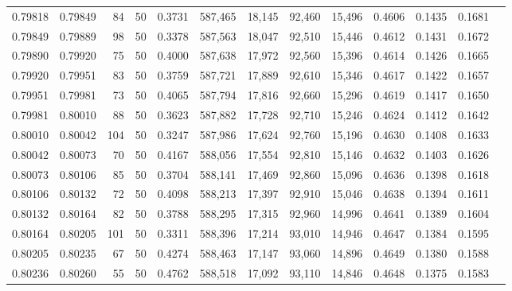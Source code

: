 \begin{tabular}{rrrrrrrrrrrrr}
0.79818 & 0.79849 &    84 &  50 &                                     0.3731 & 587,465 &  18,145 &  92,460 &  15,496 & 0.4606 & 0.1435 & 0.1681 \\
0.79849 & 0.79889 &    98 &  50 &                                     0.3378 & 587,563 &  18,047 &  92,510 &  15,446 & 0.4612 & 0.1431 & 0.1672 \\
0.79890 & 0.79920 &    75 &  50 &                                     0.4000 & 587,638 &  17,972 &  92,560 &  15,396 & 0.4614 & 0.1426 & 0.1665 \\
0.79920 & 0.79951 &    83 &  50 &                                     0.3759 & 587,721 &  17,889 &  92,610 &  15,346 & 0.4617 & 0.1422 & 0.1657 \\
0.79951 & 0.79981 &    73 &  50 &                                     0.4065 & 587,794 &  17,816 &  92,660 &  15,296 & 0.4619 & 0.1417 & 0.1650 \\
0.79981 & 0.80010 &    88 &  50 &                                     0.3623 & 587,882 &  17,728 &  92,710 &  15,246 & 0.4624 & 0.1412 & 0.1642 \\
0.80010 & 0.80042 &   104 &  50 &                                     0.3247 & 587,986 &  17,624 &  92,760 &  15,196 & 0.4630 & 0.1408 & 0.1633 \\
0.80042 & 0.80073 &    70 &  50 &                                     0.4167 & 588,056 &  17,554 &  92,810 &  15,146 & 0.4632 & 0.1403 & 0.1626 \\
0.80073 & 0.80106 &    85 &  50 &                                     0.3704 & 588,141 &  17,469 &  92,860 &  15,096 & 0.4636 & 0.1398 & 0.1618 \\
0.80106 & 0.80132 &    72 &  50 &                                     0.4098 & 588,213 &  17,397 &  92,910 &  15,046 & 0.4638 & 0.1394 & 0.1611 \\
0.80132 & 0.80164 &    82 &  50 &                                     0.3788 & 588,295 &  17,315 &  92,960 &  14,996 & 0.4641 & 0.1389 & 0.1604 \\
0.80164 & 0.80205 &   101 &  50 &                                     0.3311 & 588,396 &  17,214 &  93,010 &  14,946 & 0.4647 & 0.1384 & 0.1595 \\
0.80205 & 0.80235 &    67 &  50 &                                     0.4274 & 588,463 &  17,147 &  93,060 &  14,896 & 0.4649 & 0.1380 & 0.1588 \\
0.80236 & 0.80260 &    55 &  50 &                                     0.4762 & 588,518 &  17,092 &  93,110 &  14,846 & 0.4648 & 0.1375 & 0.1583 \\

\end{tabular}
